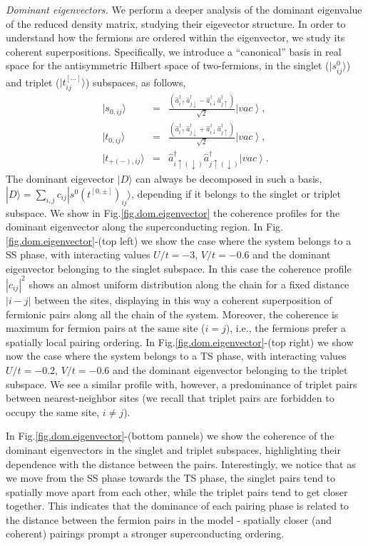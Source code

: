 \documentclass[prb,reprint,showpacs,twocolumn,superscriptaddress]{revtex4-2}
\newcommand{\ket}[1]{\left| #1 \right\rangle}
\newcommand{\ad}[1]{\hat a^{\dagger}_{#1}}
\begin{document}
\textit{Dominant eigenvectors. } We perform a deeper analysis of the dominant eigenvalue of the reduced density matrix, studying their eigevector structure. In order to understand how the fermions are ordered within the eigenvector, we study its coherent superpositions. Specifically, we introduce a ``canonical'' basis in real space for the antisymmetric Hilbert space of two-fermions, in the singlet ($|s^0_{ij}\rangle$) and triplet ($|t^{[...]}_{ij}\rangle$) subspaces, as follows, 
\begin{eqnarray}
 |s_{0,ij}\rangle &=& \frac{(\ad{i \uparrow} \ad{j \downarrow} - \ad{i \downarrow} \ad{j \uparrow} )}{\sqrt{2}} \ket{vac},\\
 |t_{0,ij}\rangle &=& \frac{(\ad{i \uparrow} \ad{j \downarrow} + \ad{i \downarrow} \ad{j \uparrow} )}{\sqrt{2}} \ket{vac}, \\
 |t_{+(-),ij}\rangle &=& \ad{i\uparrow(\downarrow)} \ad{j \uparrow(\downarrow)}\ket{vac}.
\end{eqnarray}
The dominant eigevector $|D\rangle$ can always be decomposed in such a basis, $|D\rangle = \sum_{i,j} c_{ij} |s^0 (t^{[0,\pm]})_{ij} \rangle$, depending if it belongs to the singlet or triplet subspace.
 We show in Fig.\eqref{fig.dom.eigenvector} the coherence profiles for the dominant eigenvector along the superconducting region. In Fig.\eqref{fig.dom.eigenvector}-(top left) we show the case where the system belongs to a SS phase, with interacting values $U/t=-3$, $V/t=-0.6$ and the dominant eigenvector belonging to the singlet subspace. In this case the coherence profile $|c_{ij}|^2$ shows an almost uniform distribution along the chain for a fixed distance $|i-j|$ between the sites, displaying in this way a coherent superposition of fermionic pairs along all the chain of the system. Moreover, the coherence is maximum for fermion pairs at the same site ($i=j$), i.e., the fermions prefer a spatially local pairing ordering.
 In Fig.\eqref{fig.dom.eigenvector}-(top right) we show now the case where the system belongs to a TS phase, with interacting values $U/t=-0.2$, $V/t=-0.6$ and the dominant eigenvector belonging to the triplet subspace. We see a similar profile with, however, a predominance  of triplet pairs between nearest-neighbor sites (we recall that triplet pairs are forbidden to  occupy the same site, $i\neq j$).
 
 In Fig.\eqref{fig.dom.eigenvector}-(bottom pannels) we show the coherence of the dominant eigenvectors in the singlet and triplet subspaces, highlighting their dependence with the distance between the pairs.
  Interestingly, we notice that as we move from the SS phase towards the TS phase, the singlet pairs tend to 
spatially move apart from each other, while the triplet pairs tend to get closer together.
This indicates that the dominance of each pairing phase is related to the distance between the fermion pairs in the model - spatially closer (and coherent) pairings prompt a stronger superconducting ordering.
\end{document}

